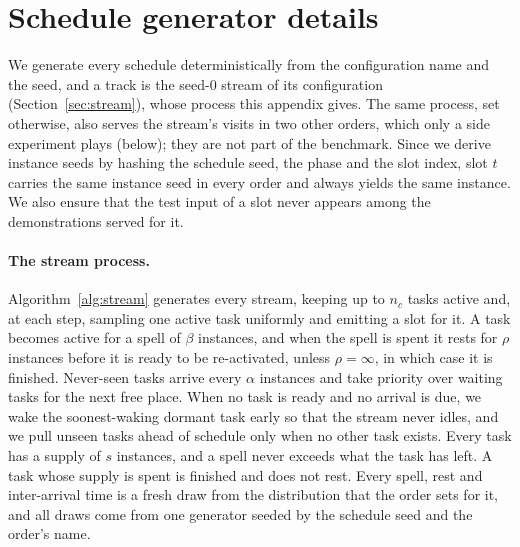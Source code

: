 \section{Schedule generator details}
\label{app:schedules}

We generate every schedule deterministically from the configuration name and the seed, and a track is the seed-0 stream of its configuration (Section~\ref{sec:stream}), whose process this appendix gives. The same process, set otherwise, also serves the stream's visits in two other orders, which only a side experiment plays (below); they are not part of the benchmark. Since we derive instance seeds by hashing the schedule seed, the phase and the slot index, slot $t$ carries the same instance seed in every order and always yields the same instance. We also ensure that the test input of a slot never appears among the demonstrations served for it.

\paragraph{The stream process.}
Algorithm~\ref{alg:stream} generates every stream, keeping up to $n_c$ tasks active and, at each step, sampling one active task uniformly and emitting a slot for it. A task becomes active for a spell of $\beta$ instances, and when the spell is spent it rests for $\rho$ instances before it is ready to be re-activated, unless $\rho = \infty$, in which case it is finished. Never-seen tasks arrive every $\alpha$ instances and take priority over waiting tasks for the next free place. When no task is ready and no arrival is due, we wake the soonest-waking dormant task early so that the stream never idles, and we pull unseen tasks ahead of schedule only when no other task exists. Every task has a supply of $s$ instances, and a spell never exceeds what the task has left. A task whose supply is spent is finished and does not rest. Every spell, rest and inter-arrival time is a fresh draw from the distribution that the order sets for it, and all draws come from one generator seeded by the schedule seed and the order's name.

